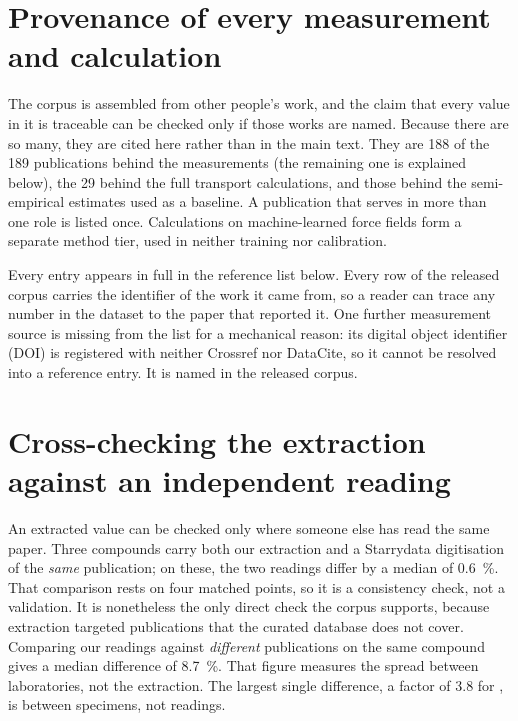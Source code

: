 \documentclass[preprint, 12pt]{elsarticle}
\begin{document}
\section{Provenance of every measurement and calculation}
\label{sec:provenance}

The corpus is assembled from other people's work, and the claim that every value in it is traceable
can be checked only if those works are named. Because there are so many, they are cited here rather
than in the main text. They are \num{188} of the \num{189} publications behind the measurements (the
remaining one is explained below), the \num{29} behind the full transport calculations, and those
behind the semi-empirical estimates used as a baseline. A publication that serves in more than one
role is listed once. Calculations on machine-learned force fields form a separate method tier, used
in neither training nor calibration.

Every entry appears in full in the reference list below. Every row of the released corpus carries
the identifier of the work it came from, so a reader can trace any number in the dataset to the
paper that reported it. One further measurement source is missing from the list for a mechanical
reason: its digital object identifier (DOI) is registered with neither Crossref nor DataCite, so it
cannot be resolved into a reference entry. It is named in the released corpus.



\section{Cross-checking the extraction against an independent reading}
\label{sec:extraction}

An extracted value can be checked only where someone else has read the same paper. Three compounds
carry both our extraction and a Starrydata digitisation of the \emph{same} publication; on these,
the two readings differ by a median of \SI{0.6}{\percent}. That comparison rests on four matched
points, so it is a consistency check, not a validation. It is nonetheless the only direct check the
corpus supports, because extraction targeted publications that the curated database does not cover.
Comparing our readings against \emph{different} publications on the same compound gives a median
difference of \SI{8.7}{\percent}. That figure measures the spread between laboratories, not the
extraction. The largest single difference, a factor of \num{3.8} for , is between
specimens, not readings.
\end{document}
